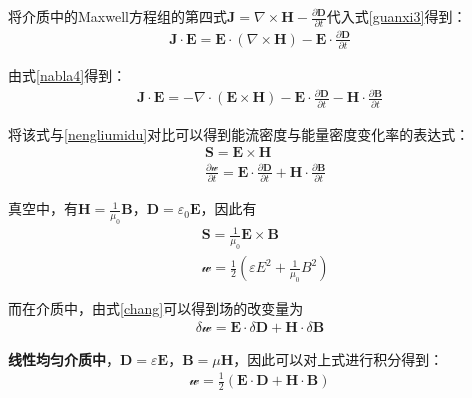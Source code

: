 \documentclass[main.tex]{subfiles}
\begin{document}
将介质中的Maxwell方程组的第四式$\boldsymbol{J}=\nabla \times \boldsymbol{H} -\frac{\partial \boldsymbol{D}}{\partial t}$代入式\ref{guanxi3}得到：
\begin{align}
    \boldsymbol{J}\cdot \boldsymbol{E} = \boldsymbol{E} \cdot (\nabla \times \boldsymbol{H}) - \boldsymbol{E} \cdot \frac{\partial \boldsymbol{D}}{\partial t}
\end{align}

由式\ref{nabla4}得到：
\begin{align}
    \boldsymbol{J}\cdot \boldsymbol{E} = -\nabla \cdot  (\boldsymbol{E} \times \boldsymbol{H}) - \boldsymbol{E} \cdot \frac{\partial \boldsymbol{D}}{\partial t} - \boldsymbol{H} \cdot \frac{\partial \boldsymbol{B}}{\partial t}
\end{align}

将该式与\ref{nengliumidu}对比可以得到能流密度与能量密度变化率的表达式：
\begin{align}
    &\boldsymbol{S} = \boldsymbol{E} \times \boldsymbol{H}\\
    \label{chang}&\frac{\partial \mathscr{w} }{\partial t} = \boldsymbol{E} \cdot \frac{\partial \boldsymbol{D}}{\partial t} + \boldsymbol{H} \cdot \frac{\partial \boldsymbol{B}}{\partial t}
\end{align}

真空中，有$\boldsymbol{H} = \frac{1}{\mu _0}\boldsymbol{B}$，$\boldsymbol{D} = \varepsilon _0\boldsymbol{E}$，因此有
\begin{align}
    \label{nengliu}&\boldsymbol{S} = \frac{1}{\mu _0}\boldsymbol{E} \times \boldsymbol{B}\\
    &\mathscr{w} = \frac{1}{2}\left(\varepsilon E^2 + \frac{1}{\mu _0}B^2 \right)
\end{align}

而在介质中，由式\ref{chang}可以得到场的改变量为
\begin{align}
    \delta \mathscr{w}  = \boldsymbol{E} \cdot \delta \boldsymbol{D} + \boldsymbol{H} \cdot \delta \boldsymbol{B}
\end{align}

\textbf{线性均匀介质中}，$\boldsymbol{D} = \varepsilon \boldsymbol{E}$，$\boldsymbol{B} = \mu \boldsymbol{H}$，因此可以对上式进行积分得到：
\begin{align}
    \label{nengliang}\mathscr{w} = \frac{1}{2} (\boldsymbol{E} \cdot \boldsymbol{D} + \boldsymbol{H} \cdot \boldsymbol{B})
\end{align}
\end{document}
